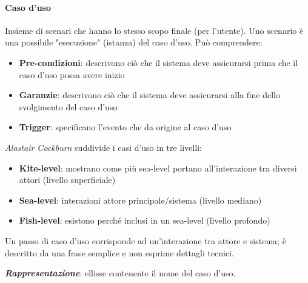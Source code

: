 \paragraph{Caso d'uso} Insieme di scenari che hanno lo stesso scopo finale (per l'utente). Uno scenario è una possibile "esecuzione" (istanza) del caso d'uso. Può comprendere:
\begin{itemize}
    \item \textbf{Pre-condizioni}: descrivono ciò che il sistema deve assicurarsi prima che il caso d'uso possa avere inizio
    \item \textbf{Garanzie}: descrivono ciò che il sistema deve assicurarsi alla fine dello svolgimento del caso d'uso
    \item \textbf{Trigger}: specificano l'evento che da origine al caso d'uso
\end{itemize}
\textit{Alastair Cockburn} suddivide i casi d'uso in tre livelli:
\begin{itemize}
    \item \textbf{Kite-level}: mostrano come più sea-level portano all'interazione tra diversi attori (livello superficiale)
    \item \textbf{Sea-level}: interazioni attore principale/sistema (livello mediano)
    \item \textbf{Fish-level}: esistono perché inclusi in un sea-level (livello profondo)
\end{itemize}
Un passo di caso d'uso corrisponde ad un'interazione tra attore e sistema; è descritto da una frase semplice e non esprime dettagli tecnici.

\textbf{\textit{Rappresentazione}}: ellisse contenente il nome del caso d'uso.

\begin{figure}[h!]
  \centering
  \hfill
\end{figure}

